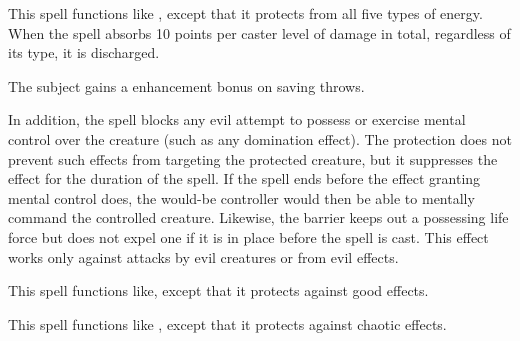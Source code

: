 \begin{spelleffect}
  This spell functions like , except that it protects from all five types of energy. When the spell absorbs 10 points per caster level of damage in total, regardless of its type, it is discharged.
\end{spelleffect}

\spellrng{\rngclose}
\begin{spelleffect}
  The subject gains a  enhancement bonus on saving throws. \bonusscalingdescription

  In addition, the spell blocks any evil attempt to possess or exercise mental control over the creature (such as any domination effect). The protection does not prevent such effects from targeting the protected creature, but it suppresses the effect for the duration of the  spell. If the  spell ends before the effect granting mental control does, the would-be controller would then be able to mentally command the controlled creature. Likewise, the barrier keeps out a possessing life force but does not expel one if it is in place before the spell is cast. This effect works only against attacks by evil creatures or from evil effects.
\end{spelleffect}

\begin{spelleffect}
  This spell functions like, except that it protects against good effects.
\end{spelleffect}

\begin{spelleffect}
  This spell functions like , except that it protects against chaotic effects.
\end{spelleffect}

